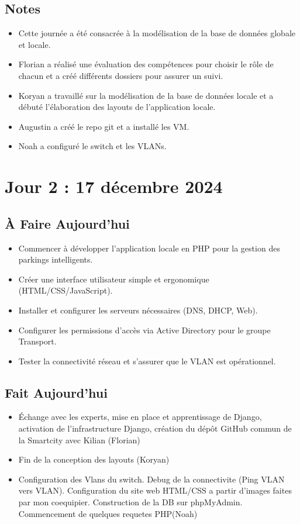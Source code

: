 \documentclass[a4paper,12pt]{report}
\begin{document}
\subsection{Notes}
\begin{itemize}
    \item Cette journée a été consacrée à la modélisation de la base de données globale et locale.
    \item Florian a réalisé une évaluation des compétences pour choisir le rôle de chacun et a créé différents dossiers pour assurer un suivi.
    \item Koryan a travaillé sur la modélisation de la base de données locale et a débuté l’élaboration des layouts de l’application locale.
    \item Augustin a créé le repo git et a installé les VM.
    \item Noah a configuré le switch et les VLANs.
\end{itemize}

\section{Jour 2 : 17 décembre 2024}

\subsection{À Faire Aujourd'hui}
\begin{itemize}
    \item Commencer à développer l'application locale en PHP pour la gestion des parkings intelligents.
    \item Créer une interface utilisateur simple et ergonomique (HTML/CSS/JavaScript).
    \item Installer et configurer les serveurs nécessaires (DNS, DHCP, Web).
    \item Configurer les permissions d'accès via Active Directory pour le groupe Transport.
    \item Tester la connectivité réseau et s'assurer que le VLAN est opérationnel.
\end{itemize}

\subsection{Fait Aujourd'hui}
\begin{itemize}
    \item Échange avec les experts, mise en place et apprentissage de Django, activation de l'infrastructure Django, création du dépôt GitHub commun de la Smartcity avec Kilian (Florian)
    \item Fin de la conception des layouts (Koryan)
    \item Configuration des Vlans du switch. Debug de la connectivite (Ping VLAN vers VLAN). Configuration du site web HTML/CSS a partir d'images faites par mon coequipier. Construction de la DB sur phpMyAdmin. Commencement de quelques requetes PHP(Noah)
\end{itemize}
\end{document}
